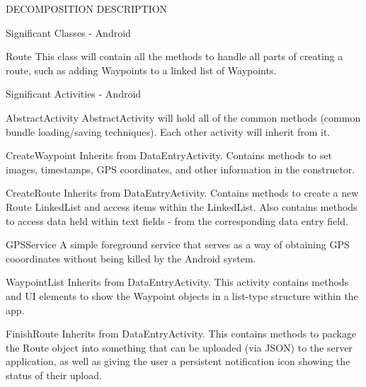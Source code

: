 \documentclass{article}
\begin{document}
\begin{section}{DECOMPOSITION DESCRIPTION}
\begin{subsection}{Significant Classes - Android}
		    \begin{subsubsection}{Route}
		    This class will contain all the methods to handle all parts of creating a route, such as adding Waypoints to a linked list of Waypoints.
		    \end{subsubsection}
	    \end{subsection}
	    
	    \begin{subsection}{Significant Activities - Android}
	    	\begin{subsubsection}{AbstractActivity}
		    AbstractActivity will hold all of the common methods (common bundle loading/saving techniques). Each other activity will inherit from it.
		    \end{subsubsection}
		    
		    \begin{subsubsection}{CreateWaypoint}
		    Inherits from DataEntryActivity. Contains methods to set images, timestamps, GPS coordinates, and other information in the constructor.
		    \end{subsubsection}
		    
		    \begin{subsubsection}{CreateRoute}
		    Inherits from DataEntryActivity. Contains methods to create a new Route LinkedList and access items within the LinkedList. Also contains methods to access data held within text fields - from the corresponding data entry field.
		    \end{subsubsection}
		    
		    \begin{subsubsection}{GPSService}
		    A simple foreground service that serves as a way of obtaining GPS cooordinates without being killed by the Android system.
		    \end{subsubsection}
		    
		    \begin{subsubsection}{WaypointList}
		    Inherits from DataEntryActivity. This activity contains methods and UI elements to show the Waypoint objects in a list-type structure within the app.
		    \end{subsubsection}
		    
		    \begin{subsubsection}{FinishRoute}
		    Inherits from DataEntryActivity. This contains methods to package the Route object into something that can be uploaded (via JSON) to the server application, as well as giving the user a persistent notification icon showing the status of their upload.
		    \end{subsubsection}
		    

\end{subsection}
\end{section}
\end{document}
